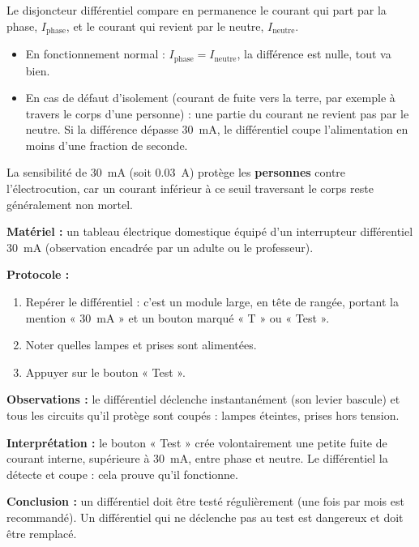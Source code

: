 \documentclass[11pt]{article}
\newcommand{\cle}[1]{{\popxbold\color{popdark}#1}}
\begin{document}
\begin{propriete}
Le \cle{disjoncteur différentiel} compare en permanence le courant qui part par la phase, $I_{\text{phase}}$, et le courant qui revient par le neutre, $I_{\text{neutre}}$.
\begin{itemize}
\item En fonctionnement normal : $I_{\text{phase}} = I_{\text{neutre}}$, la différence est nulle, tout va bien.
\item En cas de défaut d'isolement (courant de fuite vers la terre, par exemple à travers le corps d'une personne) : une partie du courant ne revient pas par le neutre. Si la différence dépasse \SI{30}{mA}, le différentiel coupe l'alimentation en moins d'une fraction de seconde.
\end{itemize}
La sensibilité de \SI{30}{mA} (soit \SI{0,03}{A}) protège les \textbf{personnes} contre l'électrocution, car un courant inférieur à ce seuil traversant le corps reste généralement non mortel.
\end{propriete}

\begin{experience}
\textbf{Matériel :} un tableau électrique domestique équipé d'un interrupteur différentiel \SI{30}{mA} (observation encadrée par un adulte ou le professeur).

\textbf{Protocole :}
\begin{enumerate}
\item Repérer le différentiel : c'est un module large, en tête de rangée, portant la mention « \SI{30}{mA} » et un bouton marqué « T » ou « Test ».
\item Noter quelles lampes et prises sont alimentées.
\item Appuyer sur le bouton « Test ».
\end{enumerate}

\textbf{Observations :} le différentiel déclenche instantanément (son levier bascule) et tous les circuits qu'il protège sont coupés : lampes éteintes, prises hors tension.

\textbf{Interprétation :} le bouton « Test » crée volontairement une petite fuite de courant interne, supérieure à \SI{30}{mA}, entre phase et neutre. Le différentiel la détecte et coupe : cela prouve qu'il fonctionne.

\textbf{Conclusion :} un différentiel doit être testé régulièrement (une fois par mois est recommandé). Un différentiel qui ne déclenche pas au test est dangereux et doit être remplacé.
\end{experience}
\end{document}
